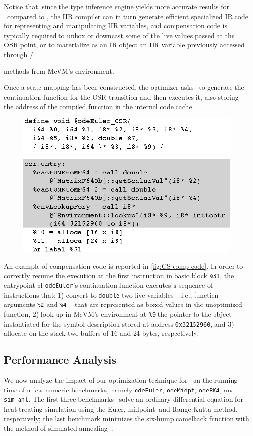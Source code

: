 Notice that, since the type inference engine yields more accurate results for \fOptIIR\ compared to \fIIR, the IIR compiler can in turn generate efficient specialized IR code for representing and manipulating IIR variables, and compensation code is typically required to unbox or downcast some of the live values passed at the OSR point, or to materialize as an IR object an IIR variable previously accessed through /{ methods from McVM's environment.

Once a state mapping has been constructed, the optimizer asks \osrkit\ to generate the continuation function for the OSR transition and then executes it, also storing the address of the compiled function in the internal code cache.

\ifdefined\noauthorea
\begin{figure}[!ht]
\begin{center}
\includegraphics[width=0.7\columnwidth]{figures/CS-comp-code/CS-comp-code.eps}
\caption{\protect}
\end{center}
\end{figure}
\fi

An example of compensation code is reported in \myfigure\ref{fig:CS-comp-code}. In order to correctly resume the execution at the first instruction in basic block {\tt \%31}, the entrypoint of {\tt odeEuler}'s continuation function executes a sequence of instructions that: 1) convert to {\tt double} two live variables -- i.e., function arguments {\tt \%2} and {\tt \%4} -- that are represented as boxed values in the unoptimized function, 2) look up in McVM's environment at {\tt \%9} the pointer to the object instantiated for the symbol description stored at address {\tt 0x32152960}, and 3) allocate on the stack two buffers of 16 and 24 bytes, respectively.

\subsection{Performance Analysis}
We now analyze the impact of our optimization technique for \feval\ on the running time of a few numeric benchmarks, namely {\tt odeEuler}, {\tt odeMidpt}, {\tt odeRK4}, and {\tt sim\_anl}. The first three benchmarks~\cite{Recktenwald2000} solve an ordinary differential equation for heat treating simulation using the Euler, midpoint, and Range-Kutta method, respectively; the last benchmark minimizes the six-hump camelback function with the method of simulated annealing~\cite{simanl}.

}
